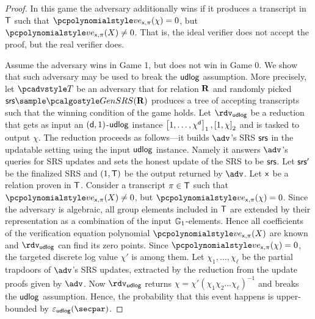 {\begin{proof}
	 In this game the adversary additionally wins if it produces a
	transcript in $\mathsf{T}$ such that $\vereq_{\inp, \zkproof}(\chi) = 0$, but
	$\vereq_{\inp, \zkproof}(X) \neq 0$. That is, the ideal verifier does not
	accept the proof, but the real verifier does.
	
	 Assume the adversary wins in Game 1, but
	does not win in Game 0. We show that such adversary may be used to break the
	$\mathsf{udlog}$ assumption. More precisely, let $\tdv$ be an adversary that for
	relation $\mathbf{R}$ and randomly picked $\srs \sample \kgen(\REL)$ produces a tree
	of accepting transcripts such that the winning condition of the game
	holds. Let $\rdvdulog$ be a reduction that gets as input an
	$(\mathsf{d}, 1)$-$\mathsf{udlog}$ instance $\left[1, \ldots, \chi^{\mathsf{d}}\right]_{1}, \left[1, \chi\right]_{2}$ and
	is tasked to output $\chi$. The reduction proceeds as follows---it builds $\adv$'s SRS $\mathsf{srs}$ in the updatable setting using the input $\mathsf{udlog}$ instance. Namely it answers $\adv$'s queries for SRS updates and sets the honest update of the SRS to be $\mathsf{srs}$. Let $\mathsf{srs}'$ be the finalized SRS and $(1, \mathsf{T})$ be the output
	returned by $\adv$. Let $\mathsf{x}$ be a relation proven in $\mathsf{T}$.  Consider a
	transcript $\pi \in \mathsf{T}$ such that $\vereq_{\inp, \zkproof}(X) \neq 0$,
	but $\vereq_{\inp, \zkproof}(\chi) = 0$. Since the adversary is algebraic, all
	group elements included in $\mathsf{T}$ are extended by their representation as a
	combination of the input $\mathbb{G}_1$-elements. Hence all coefficients of the
	verification equation polynomial $\vereq_{\inp, \zkproof}(X)$ are known and
	$\rdvudlog$ can find its zero points. Since
	$\vereq_{\inp, \zkproof}(\chi) = 0$, the targeted discrete log value $\chi'$ is
	among them.  Let $\chi_1, \ldots, \chi_\ell$ be the partial trapdoors of $\adv$'s SRS updates,  extracted by the reduction from the update proofs given by $\adv$. Now $\rdvudlog$ returns $\chi = \chi' (\chi_1 \chi_2 \ldots \chi_\ell)^{-1}$ and breaks the $\mathsf{udlog}$ assumption. Hence, the probability that this event happens is upper-bounded
	by $\epsudlog(\secpar)$.
	
\end{proof}}

